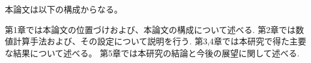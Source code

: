 \documentclass[/Users/ikedahajime/GitHub/reserch/master_report/thesis]{subfiles}
\begin{document}




本論文は以下の構成からなる。

第1章では本論文の位置づけおよび、本論文の構成について述べる.
第2章では数値計算手法および、その設定について説明を行う.
第3,4章では本研究で得た主要な結果について述べる。
第5章では本研究の結論と今後の展望に関して述べる.
\end{document}
